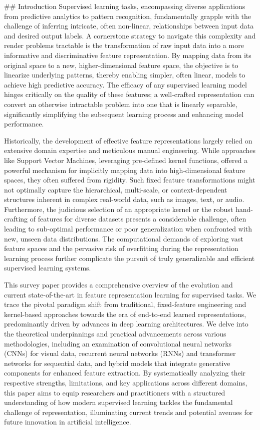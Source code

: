 \documentclass{article}
\begin{document}
\#\# Introduction
Supervised learning tasks, encompassing diverse applications from predictive analytics to pattern recognition, fundamentally grapple with the challenge of inferring intricate, often non-linear, relationships between input data and desired output labels. A cornerstone strategy to navigate this complexity and render problems tractable is the transformation of raw input data into a more informative and discriminative feature representation. By mapping data from its original space to a new, higher-dimensional feature space, the objective is to linearize underlying patterns, thereby enabling simpler, often linear, models to achieve high predictive accuracy. The efficacy of any supervised learning model hinges critically on the quality of these features; a well-crafted representation can convert an otherwise intractable problem into one that is linearly separable, significantly simplifying the subsequent learning process and enhancing model performance.

Historically, the development of effective feature representations largely relied on extensive domain expertise and meticulous manual engineering. While approaches like Support Vector Machines, leveraging pre-defined kernel functions, offered a powerful mechanism for implicitly mapping data into high-dimensional feature spaces, they often suffered from rigidity. Such fixed feature transformations might not optimally capture the hierarchical, multi-scale, or context-dependent structures inherent in complex real-world data, such as images, text, or audio. Furthermore, the judicious selection of an appropriate kernel or the robust hand-crafting of features for diverse datasets presents a considerable challenge, often leading to sub-optimal performance or poor generalization when confronted with new, unseen data distributions. The computational demands of exploring vast feature spaces and the pervasive risk of overfitting during the representation learning process further complicate the pursuit of truly generalizable and efficient supervised learning systems.

This survey paper provides a comprehensive overview of the evolution and current state-of-the-art in feature representation learning for supervised tasks. We trace the pivotal paradigm shift from traditional, fixed-feature engineering and kernel-based approaches towards the era of end-to-end learned representations, predominantly driven by advances in deep learning architectures. We delve into the theoretical underpinnings and practical advancements across various methodologies, including an examination of convolutional neural networks (CNNs) for visual data, recurrent neural networks (RNNs) and transformer networks for sequential data, and hybrid models that integrate generative components for enhanced feature extraction. By systematically analyzing their respective strengths, limitations, and key applications across different domains, this paper aims to equip researchers and practitioners with a structured understanding of how modern supervised learning tackles the fundamental challenge of representation, illuminating current trends and potential avenues for future innovation in artificial intelligence.
\end{document}
